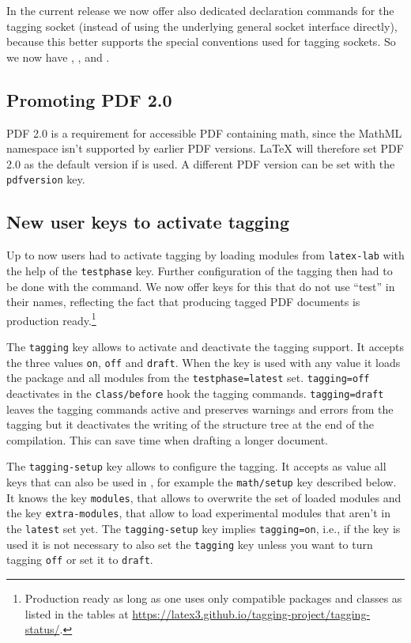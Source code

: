\documentclass{ltnews}
\begin{document}
In the current release we now offer also dedicated declaration
commands for the tagging socket (instead of using the underlying
general socket interface directly), because this better supports the
special conventions used for tagging sockets. So we now have
, , and
.


\subsection{Promoting PDF 2.0}

PDF 2.0 is a requirement for accessible PDF containing math, since the
MathML namespace isn't supported by earlier PDF versions. \LaTeX{}
will therefore set PDF 2.0 as the default version if
 is used. A different PDF version can be set with
the \texttt{pdfversion} key.


\subsection{New user keys to activate tagging}

Up to now users had to activate tagging by loading modules from
\texttt{latex-lab} with the help of the \texttt{testphase}
key. Further configuration of the tagging then had to be done with the
 command.  We now offer keys for this that do not use
\enquote{test} in their names, reflecting the fact that producing
tagged PDF documents is production ready.\footnote{Production ready as
long as one uses only compatible packages and classes as listed in the
tables at
\url{https://latex3.github.io/tagging-project/tagging-status/}.}

The \texttt{tagging} key allows to activate and deactivate the tagging
support.  It accepts the three values \texttt{on}, \texttt{off} and
\texttt{draft}.  When the key is used with any value it loads the
 package and all modules from the
\texttt{testphase=latest} set. \texttt{tagging=off} deactivates in the
\texttt{class/before} hook the tagging
commands. \texttt{tagging=draft} leaves the tagging commands active
and preserves warnings and errors from the tagging but it deactivates
the writing of the structure tree at the end of the compilation. This
can save time when drafting a longer document.

The \texttt{tagging-setup} key allows to configure the tagging.  It
accepts as value all keys that can also be used in ,
for example the \texttt{math/setup} key described below. It knows the
key \texttt{modules}, that allows to overwrite the set of loaded
modules and the key \texttt{extra-modules}, that allow to load
experimental modules that aren't in the \texttt{latest} set yet.
%
The \texttt{tagging-setup} key implies \texttt{tagging=on}, i.e., if
the key is used it is not necessary to also set the \texttt{tagging}
key unless you want to turn tagging \texttt{off} or set it to
\texttt{draft}.
\end{document}
